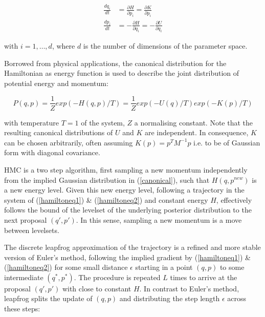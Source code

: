 \documentclass[11pt]{article}
\begin{document}
        \begin{align}
            \frac{dq_i}{dt} &= \frac{\partial H}{\partial p_i} =  \frac{\partial K}{\partial p_i} \label{hamiltoneq1} \\
            \frac{dp_i}{dt} &= -\frac{\partial H}{\partial q_i} = -\frac{\partial U}{\partial q_i}  \label{hamiltoneq2}
        \end{align}

        with $i = 1, \dots, d$, where $d$ is the number of dimensions of the parameter space.

        Borrowed from physical applications, the canonical distribution for the Hamiltonian as energy function is used to describe the joint distribution of potential energy and momentum:

        \begin{equation}\label{canonical}
            P(q,p) = \frac{1}{Z}exp(-H(q,p)/T) = \frac{1}{Z}exp(-U(q)/T)exp(-K(p)/T)
        \end{equation}

        with temperature $T=1$ of the system, $Z$ a normalising constant. Note that the resulting canonical distributions of $U$ and $K$ are independent. In consequence, $K$ can be chosen arbitrarily, often assuming $K(p) = p^TM^{-1}p$ i.e. to be of Gaussian form with diagonal covariance.

        HMC is a two step algorithm, first sampling a new momentum independently from the implied Gaussian distribution in (\ref{canonical}), such that $H(q, p^{new})$ is a new energy level. Given this new energy level, following a trajectory in the system of (\ref{hamiltoneq1}) \& (\ref{hamiltoneq2}) and constant energy $H$, effectively follows the bound of the levelset of the underlying posterior distribution to the next proposal $(q', p')$. In this sense, sampling a new momentum is a move between levelsets. %


        The discrete leapfrog approximation of the trajectory is a refined and more stable version of Euler's method, following the implied gradient by (\ref{hamiltoneq1}) \& (\ref{hamiltoneq2}) for some small distance $\epsilon$ starting in a point $(q,p)$ to some intermediate $(q^*, p^*)$. The procedure is repeated $L$ times to arrive at the proposal  $(q', p')$ with close to constant $H$. In contrast to Euler's method, leapfrog splits the update of $(q,p)$ and distributing the step length $\epsilon$ across these steps:
\end{document}
